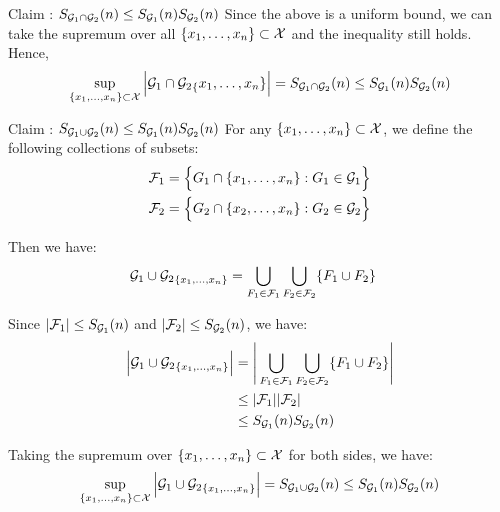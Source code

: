 \begin{solution*}
\begin{subproof}{\newline Claim : $S_{\mathcal{G}_1 \cap \mathcal{G}_2}(n) \le S_{\mathcal{G}_1}(n)S_{\mathcal{G}_2}(n)$}
        \noindent Since the above is a uniform bound, we can take the supremum over all $\{x_1, \dots, x_n\}\subset \mathcal{X}$ and the inequality still holds. Hence,
        \begin{align*}
            \sup_{\{ x_1, \dots, x_n \} \subset \mathcal{X}} \Big| 
                {\mathcal{G}_1 \cap \mathcal{G}_2}_\{x_1, \dots, x_n \}
             \Big| = S_{\mathcal{G}_1 \cap \mathcal{G}_2}(n) \le S_{\mathcal{G}_1}(n)S_{\mathcal{G}_2}(n)
        \end{align*}
    \end{subproof}

    \begin{subproof}{\newline Claim : $S_{\mathcal{G}_1 \cup \mathcal{G}_2}(n) \le S_{\mathcal{G}_1}(n)S_{\mathcal{G}_2}(n)$}
        For any $\{x_1, \dots, x_n \} \subset \mathcal{X}$, we define the following collections of subsets:
        \begin{align*}
            \mathcal{F}_1 &= \Big\{ 
                G_1 \cap \{ x_1, \dots, x_n \} : G_1 \in \mathcal{G}_1
             \Big\} \\
            \mathcal{F}_2 &= \Big\{ 
                G_2 \cap \{ x_2, \dots, x_n \} : G_2 \in \mathcal{G}_2
             \Big\}
        \end{align*}

        \noindent Then we have:
        \begin{align*}
            {\mathcal{G}_1 \cup \mathcal{G}_2}_{\{x_1, \dots, x_n \}} 
                &= \bigcup_{F_1 \in \mathcal{F}_1} \bigcup_{F_2\in\mathcal{F}_2} \{ F_1 \cup F_2 \}
        \end{align*}

        \noindent Since $|\mathcal{F}_1| \le S_{\mathcal{G}_1}(n)$ and $|\mathcal{F}_2| \le S_{\mathcal{G}_2}(n)$, we have:
        \begin{align*}
            \Big| {\mathcal{G}_1 \cup \mathcal{G}_2}_{\{x_1, \dots, x_n \}} \Big|
                &= \Bigg| \bigcup_{F_1 \in \mathcal{F}_1} \bigcup_{F_2\in\mathcal{F}_2} \{ F_1 \cup F_2 \} \Bigg| \\
                &\le |\mathcal{F}_1||\mathcal{F}_2| \\
                &\le S_{\mathcal{G}_1}(n)S_{\mathcal{G}_2}(n)
        \end{align*}

        \noindent Taking the supremum over $\{x_1, \dots, x_n\}\subset\mathcal{X}$ for both sides, we have:
        \begin{align*}
            \sup_{\{x_1, \dots, x_n\}\subset\mathcal{X}} \Big| {\mathcal{G}_1 \cup \mathcal{G}_2}_{\{x_1, \dots, x_n \}} \Big| = S_{\mathcal{G}_1\cup\mathcal{G}_2}(n) \le S_{\mathcal{G}_1}(n)S_{\mathcal{G}_2}(n)
        \end{align*}
    \end{subproof}
\end{solution*}


